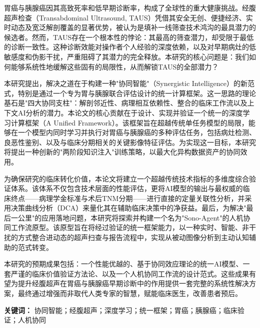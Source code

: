 
胃癌与胰腺癌因其高致死率和低早期诊断率，构成了全球性的重大健康挑战。经腹超声检查（Transabdominal Ultrasound, TAUS）凭借其安全无创、便捷经济、实时动态及宽泛解剖覆盖的显著优势，被认为是填补一线筛查技术鸿沟的最具潜力的候选者。然而，TAUS存在一个根本性的悖论：其最高的筛查潜力，却受限于最低的诊断一致性。这种诊断效能对操作者个人经验的深度依赖，以及对早期病灶的低敏感度和伪影干扰，严重阻碍了其潜力的完全释放。本研究的核心问题是：我们如何能够系统性地缓解这些固有的局限性，从而解锁TAUS的全部潜力？

本研究提出，解决之道在于构建一种"协同智能"（Synergistic Intelligence）的新范式，特别是通过一个专为胃与胰腺联合评估设计的统一计算框架。这一思路的理论基石是"四大协同支柱"：解剖邻近性、病理相互依赖性、整合的临床工作流以及上下文AI分析的潜力。本论文的核心贡献在于设计、实现并验证一个统一的深度学习计算框架（A Unified Framework）。该框架旨在超越传统单任务模型的局限，能够在一个模型内同时学习并执行对胃癌与胰腺癌的多种评估任务，包括病灶检测、良恶性鉴别、以及与临床分期相关的关键影像特征评估。为实现这一目标，本研究将提出一种创新的"两阶段知识注入"训练策略，以最大化异构数据资产的协同效用。

为确保研究的临床转化价值，本论文将建立一个超越传统技术指标的多维度综合验证体系。该体系不仅包含技术层面的性能评估，更将AI模型的输出与最权威的临床终点——病理学金标准与术后TNM分期——进行直接的定量关联性分析，并采用决策曲线分析（DCA）来量化其在辅助临床决策中的净获益。最后，为解决"最后一公里"的应用落地问题，本研究将探索并构建一个名为"Sono-Agent"的人机协同工作流原型。该原型旨在将经过验证的统一框架能力，以一种实时、智能、非干扰的方式整合进动态的超声扫查与报告流程中，实现从被动图像分析到主动认知辅助的范式转变。

本研究的预期成果包括：一个性能优越的、基于协同效应理论的统一AI模型、一套严谨的临床价值验证方法论、以及一个人机协同工作流的设计范式。这些成果有望为提升经腹超声在胃癌与胰腺癌早期诊断中的作用提供一套完整的系统性解决方案，最终通过增强而非取代人类专家的智慧，赋能临床医生，改善患者预后。

\textbf{关键词：} 协同智能；经腹超声；深度学习；统一框架；胃癌；胰腺癌；临床验证；人机协同